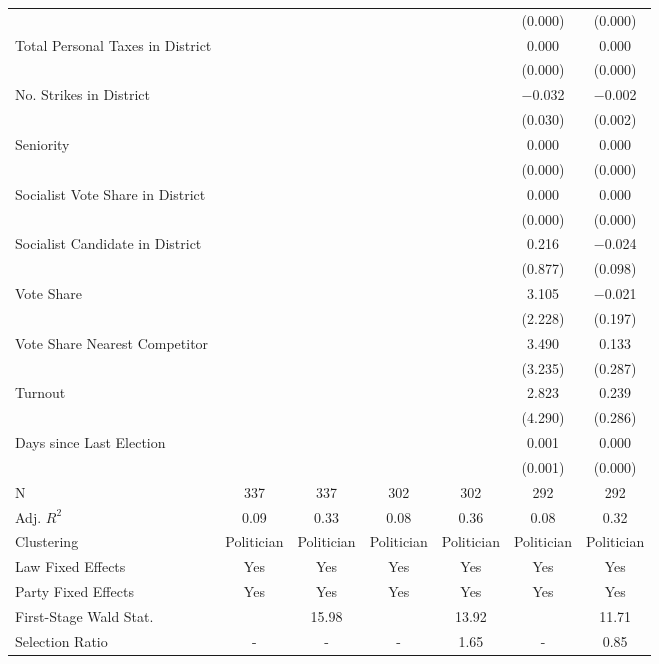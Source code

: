 \begin{table}[!h]
{\begin{threeparttable}
\begin{tabular}[t]{lcccccc}
 &  &  &  &  & (\num{0.000}) & \vphantom{3} (\num{0.000})\\
Total Personal Taxes in District &  &  &  &  & \num{0.000} & \num{0.000}\\
 &  &  &  &  & (\num{0.000}) & \vphantom{2} (\num{0.000})\\
No. Strikes in District &  &  &  &  & \num{-0.032} & \num{-0.002}\\
 &  &  &  &  & (\num{0.030}) & (\num{0.002})\\
Seniority &  &  &  &  & \num{0.000} & \num{0.000}\\
 &  &  &  &  & (\num{0.000}) & \vphantom{1} (\num{0.000})\\
Socialist Vote Share in District &  &  &  &  & \num{0.000} & \num{0.000}\\
 &  &  &  &  & (\num{0.000}) & (\num{0.000})\\
Socialist Candidate in District &  &  &  &  & \num{0.216} & \num{-0.024}\\
 &  &  &  &  & (\num{0.877}) & (\num{0.098})\\
Vote Share &  &  &  &  & \num{3.105} & \num{-0.021}\\
 &  &  &  &  & (\num{2.228}) & (\num{0.197})\\
Vote Share Nearest Competitor &  &  &  &  & \num{3.490} & \num{0.133}\\
 &  &  &  &  & (\num{3.235}) & (\num{0.287})\\
Turnout &  &  &  &  & \num{2.823} & \num{0.239}\\
 &  &  &  &  & (\num{4.290}) & (\num{0.286})\\
Days since Last Election &  &  &  &  & \num{0.001} & \num{0.000}\\
 &  &  &  &  & (\num{0.001}) & (\num{0.000})\\
\midrule
N & \num{337} & \num{337} & \num{302} & \num{302} & \num{292} & \num{292}\\
Adj. $R^2$ & \num{0.09} & \num{0.33} & \num{0.08} & \num{0.36} & \num{0.08} & \num{0.32}\\
Clustering & Politician & Politician & Politician & Politician & Politician & Politician\\
Law Fixed Effects & Yes & Yes & Yes & Yes & Yes & Yes\\
Party Fixed Effects & Yes & Yes & Yes & Yes & Yes & Yes\\
First-Stage Wald Stat. &  & 15.98 &  & 13.92 &  & 11.71\\
Selection Ratio & - & - & - & 1.65 & - & 0.85\\

\end{tabular}
\end{threeparttable}}
\end{table}

